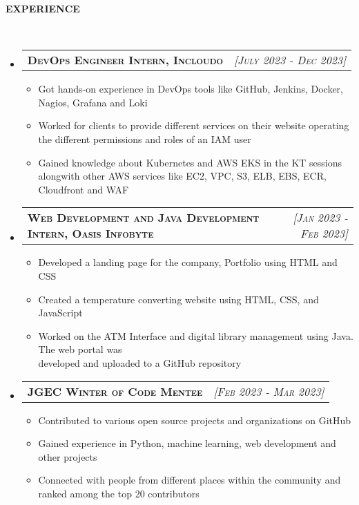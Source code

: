 \documentclass[a4paper,10pt]{article}
\makeatletter
\newcommand{\lsep}{-0.5cm}
\newcommand{\resitem}[1]{\item #1 \vspace{-2pt}}
\newcommand{\resheading}[1]{{\small \colorbox{mygrey}{\begin{minipage}{0.975\textwidth}{\textbf{#1 \vphantom{p\^{E}}}}\end{minipage}}}}
\newcommand{\ressubheading}[3]{
\begin{tabular*}{6.62in}{l @{\extracolsep{\fill}} r}
	\textsc{{\textbf{#1}}} & \textsc{\textit{[#2]}} \\
\end{tabular*}\vspace{-8pt}}
\makeatother
\begin{document}
\resheading{\textbf{EXPERIENCE} }\\[\lsep]
\begin{itemize}
\setlength\itemsep{0.5em}
\item \ressubheading{DevOps Engineer Intern, Incloudo}{July 2023 - Dec 2023}{}
\begin{itemize}
    \resitem{Got hands-on experience in DevOps tools like GitHub, Jenkins, Docker, Nagios, Grafana and Loki }
    \resitem{Worked for clients to provide different services on their website operating the different permissions and roles of an IAM user}
    \resitem{Gained knowledge about Kubernetes and AWS EKS in the KT sessions alongwith other AWS services like EC2, VPC, S3, ELB, EBS, ECR, Cloudfront and WAF  }
\end{itemize}
\item \ressubheading{Web Development and Java Development Intern, Oasis Infobyte}{Jan 2023 - Feb 2023}{}
\begin{itemize}
    \resitem{Developed a landing page for the company, Portfolio using HTML and CSS}
    \resitem{Created a temperature converting website using HTML, CSS, and JavaScript}
    \resitem{Worked on the ATM Interface and digital library management using Java. The web portal was \\ developed and uploaded to a GitHub repository}
\end{itemize}
\item \ressubheading{JGEC Winter of Code Mentee}{Feb 2023 - Mar 2023}{}
\begin{itemize}
    \resitem{Contributed to various open source projects and organizations on GitHub}
    \resitem{Gained experience in Python, machine learning, web development and other projects}
    \resitem{Connected with people from different places within the community and ranked among the top 20 contributors}
\end{itemize}
\end{itemize}
\end{document}
